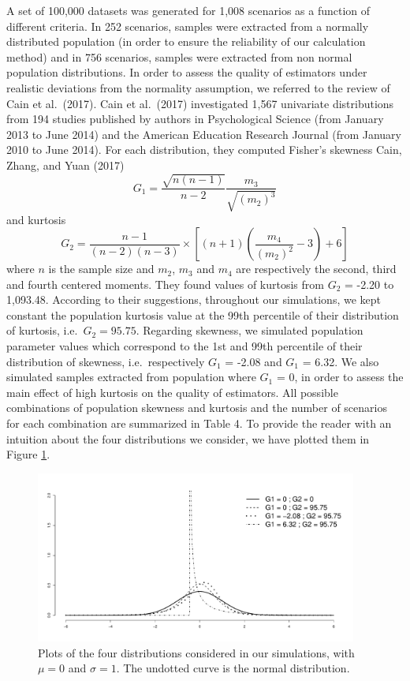 \documentclass[
  english,
  man,floatsintext]{apa6}
\begin{document}
A set of 100,000 datasets was generated for 1,008 scenarios as a function of different criteria. In 252 scenarios, samples were extracted from a normally distributed population (in order to ensure the reliability of our calculation method) and in 756 scenarios, samples were extracted from non normal population distributions. In order to assess the quality of estimators under realistic deviations from the normality assumption, we referred to the review of Cain et al.~(2017). Cain et al.~(2017) investigated 1,567 univariate distributions from 194 studies published by authors in Psychological Science (from January 2013 to June 2014) and the American Education Research Journal (from January 2010 to June 2014). For each distribution, they computed Fisher's skewness \color{white} Cain, Zhang, and Yuan (2017) \color{black}
\[G_{1}=\frac{\sqrt{n(n-1)}}{n-2} \frac{m_{3}}{\sqrt{(m_{2})^3}}\]
and kurtosis \[G_{2}=\frac{n-1}{(n-2)(n-3)}\times \left[(n+1)\left(\frac{m_{4}}{(m_{2})^2}-3\right)+6\right]\]
where \(n\) is the sample size and \(m_{2}\), \(m_{3}\) and \(m_{4}\) are respectively the second, third and fourth centered moments. They found values of kurtosis from \(G_2\) = -2.20 to 1,093.48. According to their suggestions, throughout our simulations, we kept constant the population kurtosis value at the 99th percentile of their distribution of kurtosis, i.e.~\(G_2=95.75\). Regarding skewness, we simulated population parameter values which correspond to the 1st and 99th percentile of their distribution of skewness, i.e.~respectively \(G_1\) = -2.08 and \(G_1\) = 6.32. We also simulated samples extracted from population where \(G_1\) = 0, in order to assess the main effect of high kurtosis on the quality of estimators. All possible combinations of population skewness and kurtosis and the number of scenarios for each combination are summarized in Table 4. To provide the reader with an intuition about the four distributions we consider, we have plotted them in Figure \ref{fig:DISTR}.

\begin{figure}
\includegraphics[width=400px]{ES_files/figure-latex/DISTR-1} \caption{Plots of the four distributions considered in our simulations, with $\mu=0$ and $\sigma=1$. The undotted curve is the normal distribution.}\label{fig:DISTR}
\end{figure}
\end{document}
